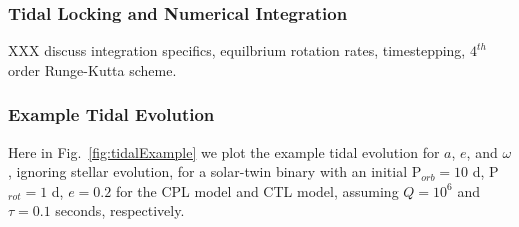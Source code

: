 \documentclass[twocolumn]{aastex61}
\begin{document}
\subsubsection{Tidal Locking and Numerical Integration}

XXX discuss integration specifics, equilbrium rotation rates, timestepping, $4^{th}$ order Runge-Kutta scheme.

\subsubsection{Example Tidal Evolution}

Here in Fig.~\ref{fig:tidalExample} we plot the example tidal evolution for $a$, $e$, and $\omega$, ignoring stellar evolution, for a solar-twin binary with an initial P$_{orb} = 10$ d, P$_{rot} = 1$ d, $e = 0.2$ for the CPL model and CTL model, assuming $Q=10^6$ and $\tau = 0.1$ seconds, respectively.
\end{document}

